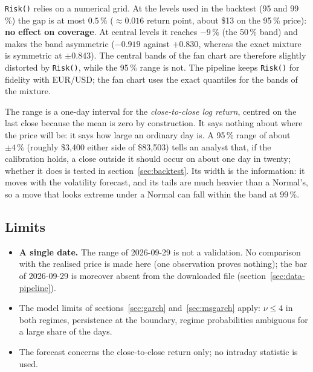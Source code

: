 \documentclass[12pt,a4paper]{article}
\begin{document}
\texttt{Risk()} relies on a numerical grid. At the levels used in the backtest (95 and 99\,\%) the gap is at most $0.5\,\%$ ($\approx 0.016$ return point, about \$13 on the 95\,\% price): \textbf{no effect on coverage}. At central levels it reaches $-9\,\%$ (the 50\,\% band) and makes the band asymmetric ($-0.919$ against $+0.830$, whereas the exact mixture is symmetric at $\pm0.843$). The central bands of the fan chart are therefore slightly distorted by \texttt{Risk()}, while the 95\,\% range is not. The pipeline keeps \texttt{Risk()} for fidelity with EUR/USD; the fan chart uses the exact quantiles for the bands of the mixture.

\begin{econbox}
	The range is a one-day interval for the \emph{close-to-close log return}, centred on the last close because the mean is zero by construction. It says nothing about where the price will be: it says how large an ordinary day is. A 95\,\% range of about $\pm4\,\%$ (roughly \$3,400 either side of \$83,503) tells an analyst that, if the calibration holds, a close outside it should occur on about one day in twenty; whether it does is tested in section~\ref{sec:backtest}. Its width is the information: it moves with the volatility forecast, and its tails are much heavier than a Normal's, so a move that looks extreme under a Normal can fall within the band at 99\,\%.
\end{econbox}

\subsection{Limits}

\begin{itemize}
	\item \textbf{A single date.} The range of 2026-09-29 is not a validation. No comparison with the realised price is made here (one observation proves nothing); the bar of 2026-09-29 is moreover absent from the downloaded file (section~\ref{sec:data-pipeline}).
	\item The model limits of sections~\ref{sec:garch} and~\ref{sec:msgarch} apply: $\nu\le4$ in both regimes, persistence at the boundary, regime probabilities ambiguous for a large share of the days.
	\item The forecast concerns the close-to-close return only; no intraday statistic is used.
\end{itemize}


\end{document}

